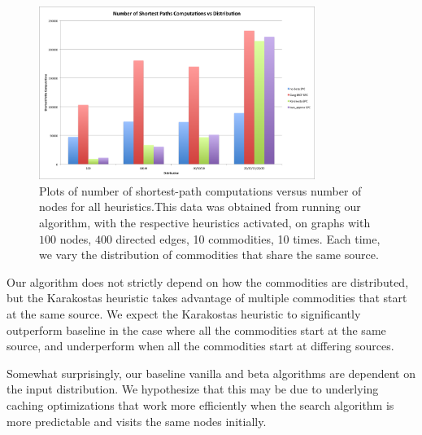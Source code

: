 \begin{figure} \begin{center}
\mbox{\includegraphics[width=0.8\textwidth]{figures/distribution.png}}
\caption{Plots of number of shortest-path computations versus number of nodes
for all heuristics.This data was obtained from running our algorithm, with the
respective heuristics activated, on graphs with $100$ nodes, $400$ directed
edges, 10 commodities, 10 times. Each time, we vary the distribution of
commodities that share the same source.} \end{center} \end{figure}

Our algorithm does not strictly depend on how the commodities are distributed,
but the Karakostas heuristic takes advantage of multiple commodities that start
at the same source. We expect the Karakostas heuristic to significantly
outperform baseline in the case where all the commodities start at the same
source, and underperform when all the commodities start at differing sources.

Somewhat surprisingly, our baseline vanilla and beta algorithms are dependent
on the input distribution.  We hypothesize that this may be due to underlying
caching optimizations that work more efficiently when the search algorithm is
more predictable and visits the same nodes initially.

